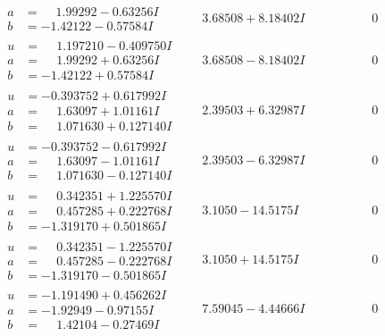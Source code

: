 \documentclass[1p]{elsarticle_modified}
\theoremstyle{definition}
\begin{document}
$$\begin{array}{c|c|c}
\begin{aligned}
a &= \phantom{-}1.99292 - 0.63256 I \\
b &= -1.42122 - 0.57584 I\end{aligned}
 & \phantom{-}3.68508 + 8.18402 I & \phantom{-0.000000 } 0 \\ \hline\begin{aligned}
u &= \phantom{-}1.197210 - 0.409750 I \\
a &= \phantom{-}1.99292 + 0.63256 I \\
b &= -1.42122 + 0.57584 I\end{aligned}
 & \phantom{-}3.68508 - 8.18402 I & \phantom{-0.000000 } 0 \\ \hline\begin{aligned}
u &= -0.393752 + 0.617992 I \\
a &= \phantom{-}1.63097 + 1.01161 I \\
b &= \phantom{-}1.071630 + 0.127140 I\end{aligned}
 & \phantom{-}2.39503 + 6.32987 I & \phantom{-0.000000 } 0 \\ \hline\begin{aligned}
u &= -0.393752 - 0.617992 I \\
a &= \phantom{-}1.63097 - 1.01161 I \\
b &= \phantom{-}1.071630 - 0.127140 I\end{aligned}
 & \phantom{-}2.39503 - 6.32987 I & \phantom{-0.000000 } 0 \\ \hline\begin{aligned}
u &= \phantom{-}0.342351 + 1.225570 I \\
a &= \phantom{-}0.457285 + 0.222768 I \\
b &= -1.319170 + 0.501865 I\end{aligned}
 & \phantom{-}3.1050 - 14.5175 I & \phantom{-0.000000 } 0 \\ \hline\begin{aligned}
u &= \phantom{-}0.342351 - 1.225570 I \\
a &= \phantom{-}0.457285 - 0.222768 I \\
b &= -1.319170 - 0.501865 I\end{aligned}
 & \phantom{-}3.1050 + 14.5175 I & \phantom{-0.000000 } 0 \\ \hline\begin{aligned}
u &= -1.191490 + 0.456262 I \\
a &= -1.92949 - 0.97155 I \\
b &= \phantom{-}1.42104 - 0.27469 I\end{aligned}
 & \phantom{-}7.59045 - 4.44666 I & \phantom{-0.000000 } 0\\

\end{array}$$
\end{document}
